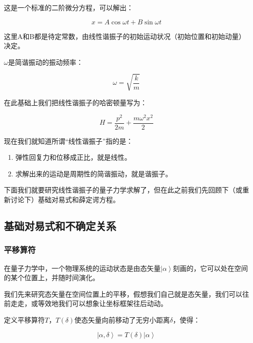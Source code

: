 这是一个标准的二阶微分方程，可以解出：

\begin{equation}
x = A \cos \omega t + B \sin \omega t
\end{equation}

这里A和B都是待定常数，由线性谐振子的初始运动状况（初始位置和初始动量）决定。

$\omega$是简谐振动的振动频率：

\begin{equation}
\omega = \sqrt{\frac{k}{m}}
\end{equation}

在此基础上我们把线性谐振子的哈密顿量写为：

\begin{equation}
H = \frac{p^2}{2m} + \frac{m \omega^2 x^2}{2}
\end{equation}

现在我们就知道所谓“线性谐振子”指的是：

\begin{enumerate}

\item 

弹性回复力和位移成正比，就是线性。

\item

求解出来的运动是周期性的简谐振动，就是谐振子。

\end{enumerate}

下面我们就要研究线性谐振子的量子力学求解了，但在此之前我们先回顾下（或重新讨论下）基础对易式和薛定谔方程。

\subsection{基础对易式和不确定关系}

\subsubsection{平移算符}

在量子力学中，一个物理系统的运动状态是由态矢量$\left| \alpha \right\rangle$刻画的，它可以处在空间的某个位置上，并随时间演化。

我们先来研究态矢量在空间位置上的平移，假想我们自己就是态矢量，我们可以往前走走，或等效地我们可以想象让坐标框架往后动动。

定义平移算符$T$，$T(\delta)$使态矢量向前移动了无穷小距离$\delta$，使得：

\begin{equation}
\left| \alpha, \delta \right\rangle = T(\delta) \left| \alpha \right\rangle 
\end{equation}

